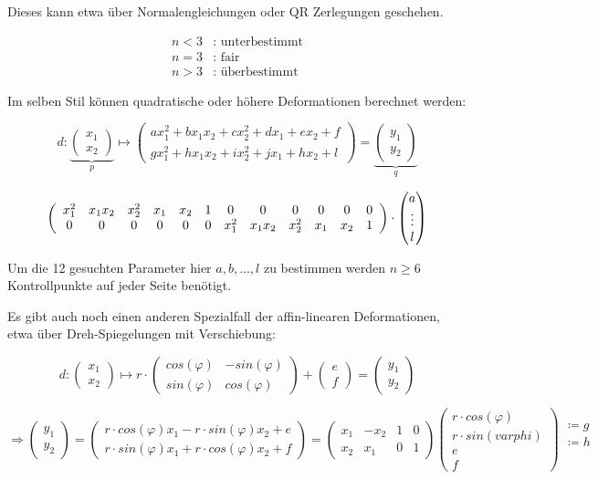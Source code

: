 \documentclass{article}
\theoremstyle{plain}
\theoremstyle{definition}
\numberwithin{equation}{section}
\newcommand{\C}[0]{
    \cdot
}
\newcommand{\x}[0] {
  \boldsymbol{x}
}
\newcommand{\y}[0] {
    \boldsymbol{y}
}
\newcommand{\mat}[1] {
\begin{pmatrix} #1 \end{pmatrix}
}
\begin{document}
Dieses kann etwa über Normalengleichungen oder QR Zerlegungen geschehen.

\begin{align*}
    n<3&\text{: unterbestimmt}\\
    n=3&\text{: fair}\\
    n>3&\text{: überbestimmt}
\end{align*}

Im selben Stil können quadratische oder höhere Deformationen berechnet werden:

\[d:\underbrace{\mat{x_1 \\ x_2}}_{p} \mapsto \mat{ax_1^2 + b x_1 x_2 + c x_2^2 + d x_1 + e x_2 +f\\ g x_1^2 + hx_1x_2 + ix_2^2 + jx_1 + hx_2 +l} = \underbrace{\mat{y_1\\y_2}}_{q}\]

\[\left(
    \begin{array}{*{12}c}
        x_1^2 & x_1x_2 & x_2^2 & x_1 & x_2 & 1 & 0 & 0 & 0 & 0 & 0 & 0\\
        0 & 0 & 0 & 0 & 0 & 0 & x_1^2 & x_1x_2 & x_2^2 & x_1 & x_2 & 1
    \end{array}
    \right) \C \mat{a\\ \vdots \\ l}\]

Um die 12 gesuchten Parameter hier $a,b, ... ,l$ zu bestimmen werden $n \geq 6$ Kontrollpunkte auf jeder Seite benötigt.

Es gibt auch noch einen anderen Spezialfall der affin-linearen Deformationen, etwa über Dreh-Spiegelungen mit Verschiebung:

\[d: \mat{x_1\\x_2} \mapsto r \C \mat{cos(\varphi) & -sin(\varphi)\\ sin(\varphi) & cos(\varphi)} + \mat{e\\f}=\mat{y_1\\y_2}\]

\[\Rightarrow \mat{y_1\\y_2} = \mat{r \C cos(\varphi)x_1 -r \C sin(\varphi)x_2 + e\\ r \C sin(\varphi)x_1 + r \C cos(\varphi) x_2 + f} = \mat{x_1 & -x_2 & 1 & 0\\ x_2 & x_1 & 0 & 1} \mat{r \C cos(\varphi)\\ r \C sin(varphi)\\e \\ f} \begin{array}{c}
     \coloneqq g\\ \coloneqq h\\ \ \\ \
\end{array}\]
\end{document}
